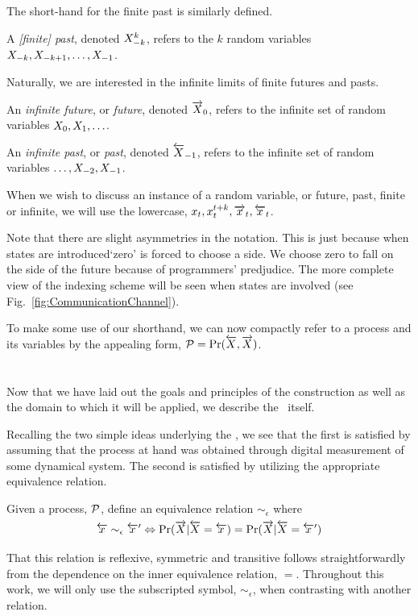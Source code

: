 The short-hand for the finite past is similarly defined.
\begin{Def}
A \emph{[finite] past}, denoted ${X}_{-k}^{k}$, refers to the $k$ random variables ${X}_{-k}, {X}_{-k+1}, \ldots, {X}_{-1}$.
\end{Def}
Naturally, we are interested in the infinite limits of finite futures and pasts.
\begin{Def}
An \emph{infinite future}, or \emph{future}, denoted $\smash{\overrightarrow{{X}}}_0$, refers to the infinite set of random variables ${X}_{0}, {X}_{1}, \ldots $.
\end{Def}
\begin{Def}
An \emph{infinite past}, or \emph{past}, denoted $\smash{\overleftarrow {{X}}}_{-1}$, refers to the infinite set of random variables $\ldots, {X}_{-2}, {X}_{-1}$.
\end{Def}
When we wish to discuss an instance of a random variable, or future, past, finite or infinite, we will use the lowercase, ${x}_{t}, {x}_{t}^{t+k}, \smash{\overrightarrow{{x}}}_t, \smash{\overleftarrow {{x}}}_t$.

Note that there are slight asymmetries in the notation. This is just because when states are introduced`zero' is forced to choose a side. We choose zero to fall on the side of the future because of programmers' predjudice. The more complete view of the indexing scheme will be seen when states are involved (see Fig.~\ref{fig:CommunicationChannel}).

To make some use of our shorthand, we can now compactly refer to a process and its variables by the appealing form, $\mathcal{P} = \Pr(\smash{\overleftarrow {{X}}}, \smash{\overrightarrow{{X}}})$.

\section{\eMs}
Now that we have laid out the goals and principles of the construction as well as the domain to which it will be applied, we describe the \eM\ itself.

Recalling the two simple ideas underlying the \eM, we see that the first is satisfied by assuming that the process at hand was obtained through digital measurement of some dynamical system. The second is satisfied by utilizing the appropriate equivalence relation.
\begin{Def}
Given a process, $\mathcal{P}$, define an equivalence relation $\sim_{\epsilon}$ where
\begin{align*}
\smash{\overleftarrow {{x}}} \sim_{\epsilon} {\smash{\overleftarrow {{x}}}}^{\prime} \Leftrightarrow \Pr(\smash{\overrightarrow{{X}}}|\smash{\overleftarrow {{X}}} = \smash{\overleftarrow {{x}}}) = \Pr(\smash{\overrightarrow{{X}}}|\smash{\overleftarrow {{X}}} = {\smash{\overleftarrow {{x}}}}^{\prime})
\end{align*}
\end{Def}
That this relation is reflexive, symmetric and transitive follows straightforwardly from the dependence on the inner equivalence relation, $=$. Throughout this work, we will only use the subscripted symbol, $\sim_{\epsilon}$, when contrasting with another relation.

